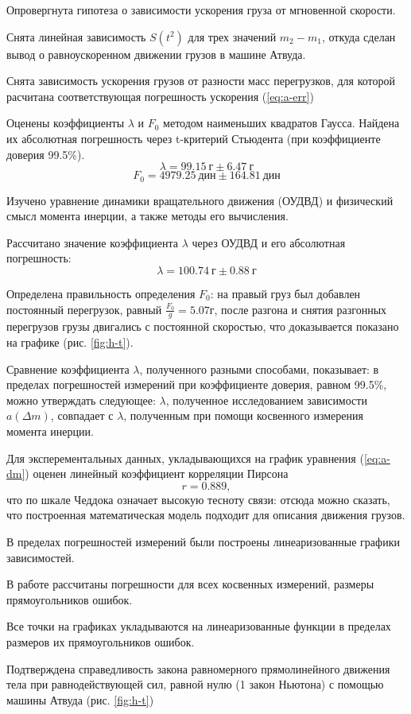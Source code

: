 \documentclass[a4paper,12pt]{report}
\newcommand{\dm}{\Delta{}m}
\begin{document}
Опровергнута гипотеза о зависимости ускорения груза от мгновенной скорости.

Снята линейная зависимость $S(t^2)$ для трех значений $m_2-m_1$, откуда сделан вывод о равноускоренном движении грузов в машине Атвуда.

Снята зависимость ускорения грузов от разности масс перегрузков,
для которой расчитана соответствующая погрешность ускорения (\ref{eq:a-err})

Оценены коэффициенты $\lambda$  и $F_0$ методом наименьших квадратов Гаусса.
Найдена их абсолютная погрешность через t-критерий Стьюдента (при коэффициенте доверия 99.5\%).
$$\lambda=99.15\ \text{г} \pm 6.47\ \text{г}$$
$$F_0=4979.25\ \text{дин} \pm 164.81\ \text{дин}$$

Изучено уравнение динамики вращательного движения (ОУДВД) и физический смысл момента инерции, а также методы его вычисления.

Рассчитано значение коэффициента $\lambda$ через ОУДВД и его абсолютная погрешность:
$$\lambda=100.74\ \text{г} \pm 0.88\ \text{г}$$

Определена правильность определения $F_0$: на правый груз был добавлен постоянный перегрузок, равный $\frac{F_0}{g}=5.07 \text{г}$, после разгона и снятия разгонных перегрузов грузы двигались с постоянной скоростью, что доказывается показано на графике (рис. \ref{fig:h-t}).

Сравнение коэффициента $\lambda$, полученного разными способами, показывает: в пределах погрешностей измерений при коэффициенте доверия, равном 99.5\%, можно утверждать следующее: $\lambda$, полученное исследованием зависимости $a(\dm)$, совпадает с $\lambda$, полученным при помощи косвенного измерения момента инерции.

Для эксперементальных данных, укладывающихся на график уравнения (\ref{eq:a-dm}) оценен линейный коэффициент корреляции Пирсона $$r=0.889,$$ что по шкале Чеддока означает высокую тесноту связи: отсюда можно сказать, что построенная математическая модель подходит для описания движения грузов.

В пределах погрешностей измерений были построены линеаризованные графики зависимостей.

В работе рассчитаны погрешности для всех косвенных измерений, размеры прямоугольников ошибок. 

Все точки на графиках укладываются на линеаризованные функции в пределах размеров их прямоугольников ошибок.

Подтверждена справедливость закона равномерного прямолинейного движения тела при равнодействующей сил, равной нулю (1 закон Ньютона) с помощью машины Атвуда (рис. \ref{fig:h-t})
\end{document}
